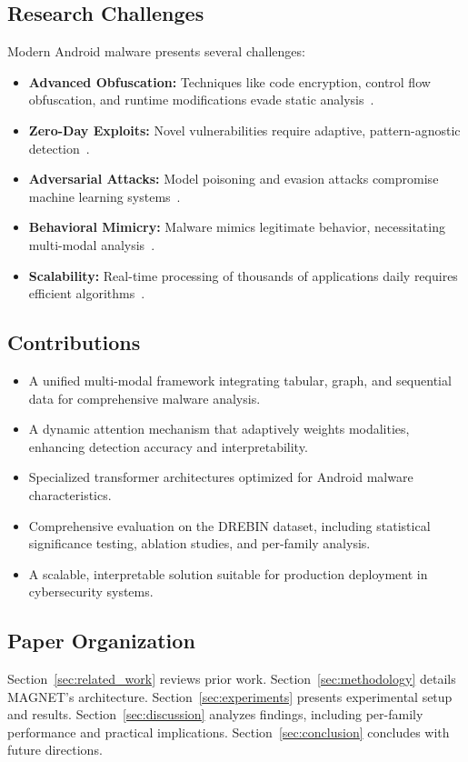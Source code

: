 \documentclass[10pt,conference]{IEEEtran}
\begin{document}
\subsection{Research Challenges}
Modern Android malware presents several challenges:
\begin{itemize}
    \item \textbf{Advanced Obfuscation:} Techniques like code encryption, control flow obfuscation, and runtime modifications evade static analysis~\cite{ObfuscationTechniques2023}.
    \item \textbf{Zero-Day Exploits:} Novel vulnerabilities require adaptive, pattern-agnostic detection~\cite{ZeroDayThreats2023}.
    \item \textbf{Adversarial Attacks:} Model poisoning and evasion attacks compromise machine learning systems~\cite{AdversarialML2023}.
    \item \textbf{Behavioral Mimicry:} Malware mimics legitimate behavior, necessitating multi-modal analysis~\cite{BehavioralMimicry2023}.
    \item \textbf{Scalability:} Real-time processing of thousands of applications daily requires efficient algorithms~\cite{ScalabilityChallenge2023}.
\end{itemize}

\subsection{Contributions}
\begin{itemize}
    \item A unified multi-modal framework integrating tabular, graph, and sequential data for comprehensive malware analysis.
    \item A dynamic attention mechanism that adaptively weights modalities, enhancing detection accuracy and interpretability.
    \item Specialized transformer architectures optimized for Android malware characteristics.
    \item Comprehensive evaluation on the DREBIN dataset, including statistical significance testing, ablation studies, and per-family analysis.
    \item A scalable, interpretable solution suitable for production deployment in cybersecurity systems.
\end{itemize}

\subsection{Paper Organization}
Section~\ref{sec:related_work} reviews prior work. Section~\ref{sec:methodology} details MAGNET’s architecture. Section~\ref{sec:experiments} presents experimental setup and results. Section~\ref{sec:discussion} analyzes findings, including per-family performance and practical implications. Section~\ref{sec:conclusion} concludes with future directions.
\end{document}
